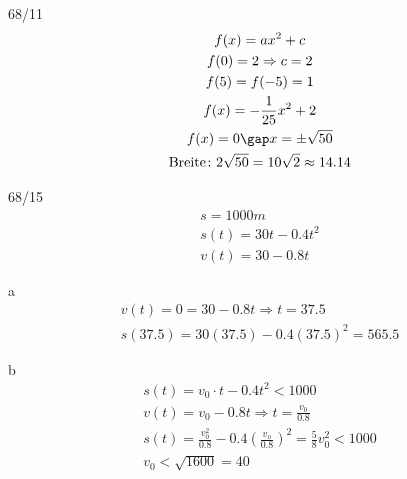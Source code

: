 \begin{exercise}{68/11}
  \begin{gather*}
    f(x) = ax^2 + c \\
    f(0) = 2 \Rightarrow c = 2 \\
    f(5) = f(-5) = 1 \\
    f(x) = -\frac{1}{25}x^2 + 2 \\
    f(x) = 0 \gap x = \pm \sqrt{50} \\
    \text{Breite} \colon 2\sqrt{50} = 10\sqrt{2} \approx 14.14
  \end{gather*}
\end{exercise}
\begin{exercise}{68/15}
  \begin{gather*}
    s = 1000m \\
    s(t) = 30t - 0.4t^2 \\
    v(t) = 30 - 0.8t
  \end{gather*}
  \item [a]
  \begin{gather*}
    v(t) = 0 = 30 - 0.8t \Rightarrow t = 37.5 \\
    s(37.5) = 30(37.5) - 0.4(37.5)^2 = 565.5
  \end{gather*}
  \item [b]
  \begin{gather*}
    s(t) = v_0 \cdot t - 0.4t^2 < 1000 \\
    v(t) = v_0 - 0.8t \Rightarrow t = \frac{v_0}{0.8} \\
    s(t) = \frac{v_0^2}{0.8} - 0.4(\frac{v_o}{0.8})^2 = \frac{5}{8}v_0^2 < 1000 \\
    v_0 < \sqrt{1600} = 40
  \end{gather*}
\end{exercise}
